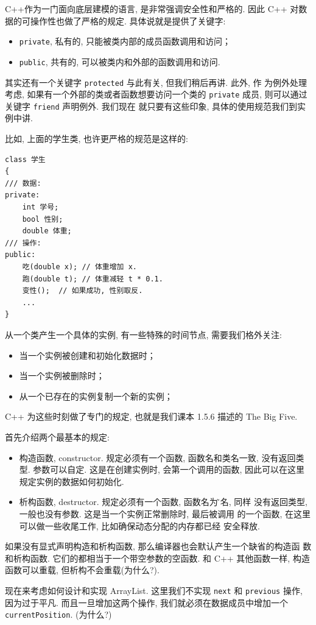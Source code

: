 \documentclass[a4paper]{ctexart}
\theoremstyle{definition}
\theoremstyle{definition}
\begin{document}
C++作为一门面向底层建模的语言, 是非常强调安全性和严格的. 因此 C++ 对数
据的可操作性也做了严格的规定. 具体说就是提供了关键字:
\begin{itemize}
\item \verb|private|, 私有的, 只能被类内部的成员函数调用和访问；
\item \verb|public|, 共有的, 可以被类内和外部的函数调用和访问.  
\end{itemize}

其实还有一个关键字 \verb|protected| 与此有关, 但我们稍后再讲. 此外, 作
为例外处理考虑, 如果有一个外部的类或者函数想要访问一个类的
\verb|private| 成员, 则可以通过关键字 \verb|friend| 声明例外. 我们现在
就只要有这些印象, 具体的使用规范我们到实例中讲.

比如, 上面的学生类, 也许更严格的规范是这样的:
\begin{verbatim}
class 学生
{
/// 数据:
private: 
    int 学号;
    bool 性别;
    double 体重;
/// 操作:
public:
    吃(double x); // 体重增加 x.
    跑(double t); // 体重减轻 t * 0.1. 
    变性();  // 如果成功, 性别取反.
    ...
}
\end{verbatim}

从一个类产生一个具体的实例, 有一些特殊的时间节点, 需要我们格外关注:
\begin{itemize}
\item 当一个实例被创建和初始化数据时；
\item 当一个实例被删除时；
\item 从一个已存在的实例复制一个新的实例；
\end{itemize}
C++ 为这些时刻做了专门的规定, 也就是我们课本 1.5.6 描述的 The Big
Five.

首先介绍两个最基本的规定:
\begin{itemize}
  \item 构造函数, constructor. 规定必须有一个函数, 函数名和类名一致,
    没有返回类型. 参数可以自定. 这是在创建实例时, 会第一个调用的函数,
    因此可以在这里规定实例的数据如何初始化.
  \item 析构函数, destructor. 规定必须有一个函数, 函数名为\~类名, 同样
    没有返回类型, 一般也没有参数. 这是当一个实例正常删除时, 最后被调用
    的一个函数, 在这里可以做一些收尾工作, 比如确保动态分配的内存都已经
    安全释放.
\end{itemize}
如果没有显式声明构造和析构函数, 那么编译器也会默认产生一个缺省的构造函
数和析构函数. 它们的都相当于一个带空参数的空函数. 和 C++ 其他函数一样,
构造函数可以重载, 但析构不会重载(为什么?).

现在来考虑如何设计和实现 ArrayList. 
这里我们不实现 \verb|next| 和 \verb|previous| 操作, 因为过于平凡. 
而且一旦增加这两个操作, 我们就必须在数据成员中增加一个 \verb|currentPosition|. 
(为什么?)
\end{document}
